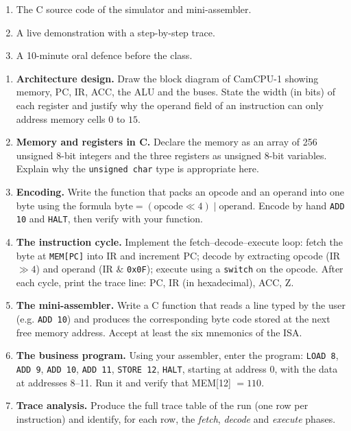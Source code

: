 \documentclass[11pt]{article}
\newcounter{popsec}
\newcounter{popsub}
\newcommand{\courssub}[1]{%
  \stepcounter{popsub}%
  \par\vspace{9pt}\noindent{\popxbold\fontsize{11.5}{13}\selectfont\color{popink}{\color{poporange}\thepopsec.\thepopsub}\hspace{6pt}#1}\par\nopagebreak\vspace{4pt}
}
\begin{document}
\courssub{Deliverables}

\begin{enumerate}
\item The C source code of the simulator and mini-assembler.
\item A live demonstration with a step-by-step trace.
\item A 10-minute oral defence before the class.
\end{enumerate}

\courssub{Tasks}

\begin{enumerate}
\item \textbf{Architecture design.} Draw the block diagram of CamCPU-1 showing memory, PC, IR, ACC, the ALU and the buses. State the width (in bits) of each register and justify why the operand field of an instruction can only address memory cells $0$ to $15$.
\item \textbf{Memory and registers in C.} Declare the memory as an array of 256 unsigned 8-bit integers and the three registers as unsigned 8-bit variables. Explain why the \texttt{unsigned char} type is appropriate here.
\item \textbf{Encoding.} Write the function that packs an opcode and an operand into one byte using the formula $\text{byte} = (\text{opcode} \ll 4) \mathbin{|} \text{operand}$. Encode by hand \texttt{ADD 10} and \texttt{HALT}, then verify with your function.
\item \textbf{The instruction cycle.} Implement the fetch--decode--execute loop: fetch the byte at \texttt{MEM[PC]} into IR and increment PC; decode by extracting opcode (IR $\gg 4$) and operand (IR $\mathbin{\&}$ \texttt{0x0F}); execute using a \texttt{switch} on the opcode. After each cycle, print the trace line: PC, IR (in hexadecimal), ACC, Z.
\item \textbf{The mini-assembler.} Write a C function that reads a line typed by the user (e.g. \texttt{ADD 10}) and produces the corresponding byte code stored at the next free memory address. Accept at least the six mnemonics of the ISA.
\item \textbf{The business program.} Using your assembler, enter the program: \texttt{LOAD 8}, \texttt{ADD 9}, \texttt{ADD 10}, \texttt{ADD 11}, \texttt{STORE 12}, \texttt{HALT}, starting at address 0, with the data at addresses 8--11. Run it and verify that MEM[12] $= 110$.
\item \textbf{Trace analysis.} Produce the full trace table of the run (one row per instruction) and identify, for each row, the \emph{fetch}, \emph{decode} and \emph{execute} phases.

\end{enumerate}
\end{document}
